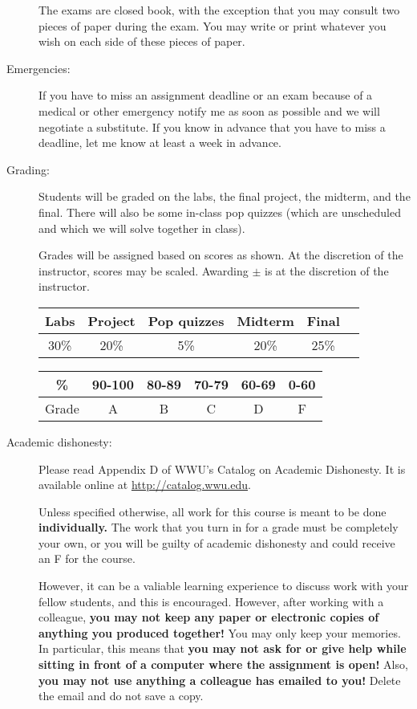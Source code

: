 \documentclass{article}
\begin{document}
\begin{description}
  The  exams are closed book, with the exception that you may consult
  two pieces of paper during the exam.  You may write or print whatever
  you wish on each side of these pieces of paper.

\item[Emergencies:] If you have to miss an assignment deadline or an
  exam because of a medical or other emergency notify me as soon as
  possible and we will negotiate a substitute.  If you know in advance
  that you have to miss a deadline, let me know at least a week in
  advance.

\item[Grading:] Students will be graded on the labs, the final
  project, the midterm, and the final.  There will also be
  some in-class pop quizzes (which are
  unscheduled and which we will solve together in class).

Grades will be assigned based on scores as shown.  At the discretion
of the instructor, scores may be scaled.  Awarding $\pm$ is at the
discretion of the instructor.

\begin{tabular}{|c|c|c|c|c|c|}\hline
Labs & Project & Pop quizzes & Midterm & Final \\\hline
30\% & 20\% & 5\% & 20\% & 25\% \\\hline
\end{tabular}

\begin{tabular}{|c|c|c|c|c|c|}\hline
\% & 90-100 & 80-89 & 70-79 & 60-69 & 0-60\\\hline
Grade & A & B & C & D & F\\\hline
\end{tabular}


\item[Academic dishonesty:] Please read Appendix D of WWU's Catalog on
  Academic Dishonesty.  It is available online at
  \url{http://catalog.wwu.edu}.

  Unless specified otherwise, all work for this course is meant to
  be done {\bf individually.}  The work that you turn in for a grade
  must be completely your own, or you will be guilty of academic
  dishonesty and could receive an F for the course.

  However, it can be a valiable learning experience to discuss
  work with your fellow students, and this is encouraged.
  However, after working with a colleague, {\bf you may not keep any
    paper or electronic copies of anything you produced together!}
  You may only keep your memories.  In particular, this means that
  {\bf you may not ask for or give help while sitting in front of a
    computer where the assignment is open!}  Also, {\bf you may not
    use anything a colleague has emailed to you!}  Delete the email
  and do not save a copy.


\end{description}
\end{document}
